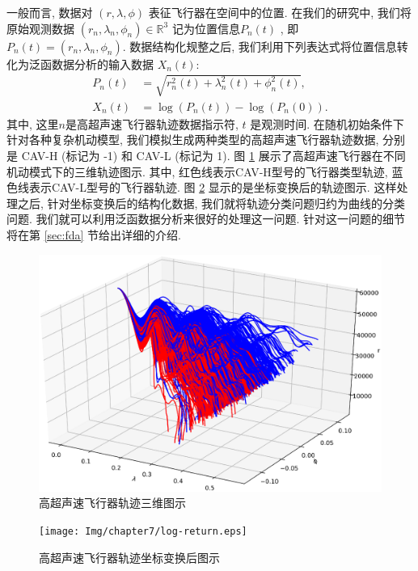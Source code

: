 一般而言, 数据对 $(r, \lambda, \phi)$ 表征飞行器在空间中的位置. 在我们的研究中, 我们将原始观测数据 $(r_{n},\lambda_{n}, \phi_{n}) \in \mathbb{R}^3$ 记为位置信息$P_{n}(t)$ , 即$P_{n}(t) = (r_{n},\lambda_{n}, \phi_{n})$. 数据结构化规整之后, 我们利用下列表达式将位置信息转化为泛函数据分析的输入数据 $X_{n}(t)$: 
\begin{align*}
P_{n}(t) &= \sqrt{r_{n}^{2}(t) + \lambda_{n}^{2}(t) + \phi_{n}^{2}(t)},\\
X_{n}(t) &= \log(P_{n}(t)) - \log(P_{n}(0)).
\end{align*}
其中, 这里$n$是高超声速飞行器轨迹数据指示符, $t$ 是观测时间. 在随机初始条件下针对各种复杂机动模型, 我们模拟生成两种类型的高超声速飞行器轨迹数据, 分别是 CAV-H (标记为 -1) 和 CAV-L (标记为 1). 图 \ref{fig:hfvmixxxx} 展示了高超声速飞行器在不同机动模式下的三维轨迹图示. 其中, 红色线表示CAV-H型号的飞行器类型轨迹, 蓝色线表示CAV-L型号的飞行器轨迹. 图 \ref{fig:hfvlog} 显示的是坐标变换后的轨迹图示. 这样处理之后, 针对坐标变换后的结构化数据, 我们就将轨迹分类问题归约为曲线的分类问题. 我们就可以利用泛函数据分析来很好的处理这一问题. 针对这一问题的细节将在第 \ref{sec:fda} 节给出详细的介绍. 

\begin{figure}
\centering
\includegraphics[width=1\linewidth]{Img/chapter7/3D-raw.eps}
\caption{高超声速飞行器轨迹三维图示}
\label{fig:hfvmixxxx}
\end{figure}

\begin{figure}
\centering
\texttt{[image: Img/chapter7/log-return.eps]}
\caption{高超声速飞行器轨迹坐标变换后图示}
\label{fig:hfvlog}
\end{figure}


